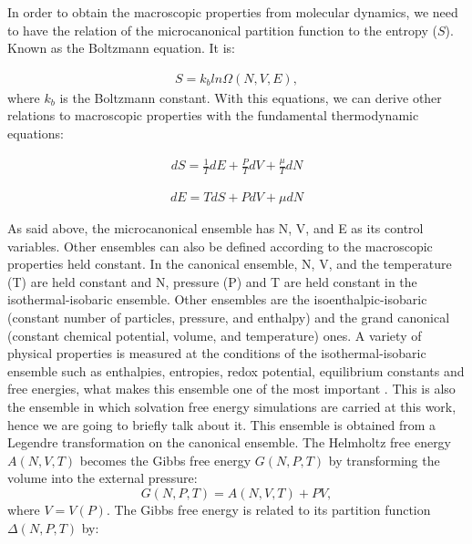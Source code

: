 In order to obtain the macroscopic properties from molecular dynamics, we need to have the relation of the microcanonical partition function to the entropy ($S$). Known as the Boltzmann equation. It is:

\begin{equation}
\begin{aligned}
S = k_{b} ln \Omega (N,V,E), 
\end{aligned}
\end{equation}
where $k_{b}$ is the Boltzmann constant. With this equations, we can derive other relations to macroscopic properties with the fundamental thermodynamic equations:

\begin{equation}
\begin{aligned}
dS = \frac{1}{T} dE + \frac{P}{T} dV + \frac{\mu}{T} dN
\end{aligned}
\end{equation}

\begin{equation}
\begin{aligned}
dE = T dS + P dV + \mu dN
\end{aligned}
\end{equation}

As said above, the microcanonical ensemble  has  N, V, and E as its control variables. Other ensembles can also be defined according to the macroscopic properties held constant.  In the canonical ensemble,  N, V, and the temperature (T) are held constant and  N, pressure (P) and T are held constant in the isothermal-isobaric ensemble. Other ensembles are the isoenthalpic-isobaric (constant number of particles, pressure, and enthalpy) and the grand canonical (constant chemical potential, volume, and temperature) ones. A variety of physical properties is measured at the conditions of the isothermal-isobaric ensemble such as enthalpies, entropies, redox potential, equilibrium constants and free energies, what makes this ensemble one of the most important \cite{tuckerman}. This is also the ensemble in which solvation free energy simulations are carried at this work, hence we are going to briefly talk about it. This ensemble is obtained from a Legendre transformation on the canonical ensemble. The Helmholtz free energy $A(N,V,T)$ becomes the Gibbs free energy $G(N,P,T)$ by transforming the volume into the external pressure:
\begin{equation}
G(N,P,T) = A(N,V,T) + PV,
\end{equation}
where $V = V(P)$. The Gibbs free energy is related to its partition function $\Delta (N,P,T)$ by:

